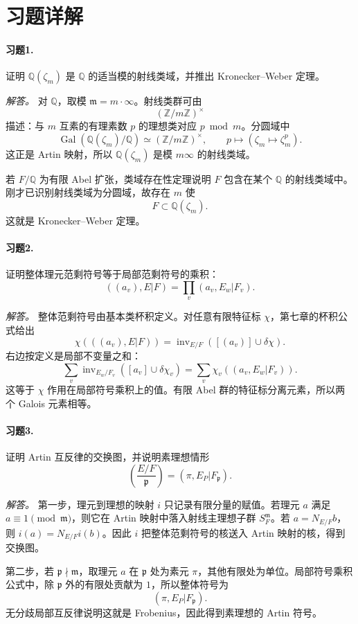 \documentclass[11pt,a4paper,openany]{ctexbook}
\numberwithin{equation}{chapter}
\newcommand{\Q}{\mathbb{Q}}
\newcommand{\Z}{\mathbb{Z}}
\newcommand{\Gal}{\operatorname{Gal}}
\theoremstyle{plain}
\theoremstyle{definition}
\theoremstyle{remark}
\begin{document}
\section*{习题详解}

\paragraph{习题1.}
证明 $\Q(\zeta_m)$ 是 $\Q$ 的适当模的射线类域，并推出 Kronecker--Weber 定理。

\emph{解答。}
对 $\Q$，取模 $\mathfrak m=m\cdot\infty$。射线类群可由
\[
(\Z/m\Z)^\times
\]
描述：与 $m$ 互素的有理素数 $p$ 的理想类对应 $p\bmod m$。分圆域中
\[
\Gal(\Q(\zeta_m)/\Q)\simeq(\Z/m\Z)^\times,\qquad
p\mapsto(\zeta_m\mapsto\zeta_m^p).
\]
这正是 Artin 映射，所以 $\Q(\zeta_m)$ 是模 $m\infty$ 的射线类域。

若 $F/\Q$ 为有限 Abel 扩张，类域存在性定理说明 $F$ 包含在某个 $\Q$ 的射线类域中。刚才已识别射线类域为分圆域，故存在 $m$ 使
\[
F\subset \Q(\zeta_m).
\]
这就是 Kronecker--Weber 定理。

\paragraph{习题2.}
证明整体理元范剩符号等于局部范剩符号的乘积：
\[
((a_v),E|F)=\prod_v(a_v,E_w|F_v).
\]

\emph{解答。}
整体范剩符号由基本类杯积定义。对任意有限特征标 $\chi$，第七章的杯积公式给出
\[
\chi(((a_v),E|F))
=\operatorname{inv}_{E/F}([(a_v)]\cup\delta\chi).
\]
右边按定义是局部不变量之和：
\[
\sum_v\operatorname{inv}_{E_w/F_v}([a_v]\cup\delta\chi_v)
=\sum_v\chi_v((a_v,E_w|F_v)).
\]
这等于 $\chi$ 作用在局部符号乘积上的值。有限 Abel 群的特征标分离元素，所以两个 Galois 元素相等。

\paragraph{习题3.}
证明 Artin 互反律的交换图，并说明素理想情形
\[
\left(\frac{E/F}{\mathfrak p}\right)=(\pi,E_P|F_\mathfrak p).
\]

\emph{解答。}
第一步，理元到理想的映射 $i$ 只记录有限分量的赋值。若理元 $a$ 满足 $a\equiv1\pmod{\mathfrak m}$，则它在 Artin 映射中落入射线主理想子群 $S_F^\mathfrak m$。若 $a=N_{E/F}b$，则 $i(a)=N_{E/F}i(b)$。因此 $i$ 把整体范剩符号的核送入 Artin 映射的核，得到交换图。

第二步，若 $\mathfrak p\nmid\mathfrak m$，取理元 $a$ 在 $\mathfrak p$ 处为素元 $\pi$，其他有限处为单位。局部符号乘积公式中，除 $\mathfrak p$ 外的有限处贡献为 $1$，所以整体符号为
\[
(\pi,E_P|F_\mathfrak p).
\]
无分歧局部互反律说明这就是 Frobenius，因此得到素理想的 Artin 符号。
\end{document}
